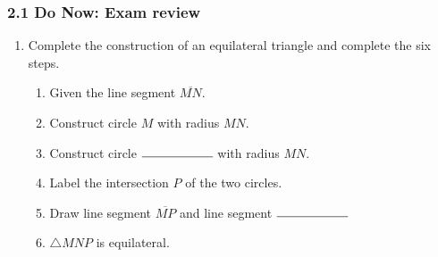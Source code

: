 \documentclass[12pt, twoside]{article}
\begin{document}
  \subsubsection*{2.1 Do Now: Exam review}
    \begin{enumerate}
      \item Complete the construction of an equilateral triangle and complete the six steps.
      \begin{enumerate}
        \item Given the line segment $\overline{MN}$.
        \bigskip
        \item Construct circle $M$ with radius $MN$.
        \bigskip
        \item Construct circle $\rule{2cm}{0.15mm}$  with radius $MN$. \bigskip
        \item Label the intersection $P$ of the two circles.
        \bigskip
        \item Draw line segment $\overline{MP}$ and line segment $\rule{2cm}{0.15mm}$
        \bigskip
        \item $\triangle MNP$ is equilateral.
      \end{enumerate}
      \vspace{7cm}
      \begin{center}
      \end{center}
    \end{enumerate}
\end{document}
